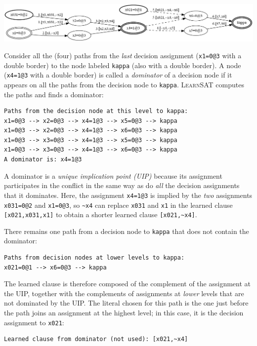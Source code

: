 \documentclass[11pt]{report}
\newcommand*{\p}[1]{\textup{\texttt{#1}}}
\newcommand*{\ls}{\textsc{LearnSAT}}
\begin{document}
\begin{center}
\includegraphics[keepaspectratio=true,width=\textwidth]{graph-bw}
\end{center}

Consider all the (four) paths from the \emph{last} decision assignment
(\p{x1=0@3} with a double border) to the node labeled \p{kappa} (also
with a double border). A node (\p{x4=1@3} with a double border) is
called a \emph{dominator} of a decision node if it appears on all the
paths from the decision node to \p{kappa}. \ls{} computes the paths and
finds a dominator:

\begin{verbatim}
Paths from the decision node at this level to kappa:
x1=0@3 --> x2=0@3 --> x4=1@3 --> x5=0@3 --> kappa
x1=0@3 --> x2=0@3 --> x4=1@3 --> x6=0@3 --> kappa
x1=0@3 --> x3=0@3 --> x4=1@3 --> x5=0@3 --> kappa
x1=0@3 --> x3=0@3 --> x4=1@3 --> x6=0@3 --> kappa
A dominator is: x4=1@3
\end{verbatim}

A dominator is a \emph{unique implication point (UIP)} because its
assignment participates in the conflict in the same way as do \emph{all}
the decision assignments that it dominates. Here, the assignment
\p{x4=1@3} is implied by the \emph{two} assignments \p{x031=0@2} and
\p{x1=0@3}, so \verb+~x4+ can replace \p{x031} and \p{x1} in the learned
clause \verb+[x021,x031,x1]+ to obtain a shorter learned clause
\verb+[x021,~x4]+.

There remains one path from a decision node to \p{kappa} that does not
contain the dominator:
\begin{verbatim}
Paths from decision nodes at lower levels to kappa:
x021=0@1 --> x6=0@3 --> kappa
\end{verbatim}

The learned clause is therefore composed of the complement of the
assignment at the UIP, together with the complements of assignments at
\emph{lower} levels that are not dominated by the UIP. The literal
chosen for this path is the one just before the path joins an assignment
at the highest level; in this case, it is the decision assignment to
\verb+x021+:

\begin{verbatim}
Learned clause from dominator (not used): [x021,~x4]
\end{verbatim}
\end{document}
